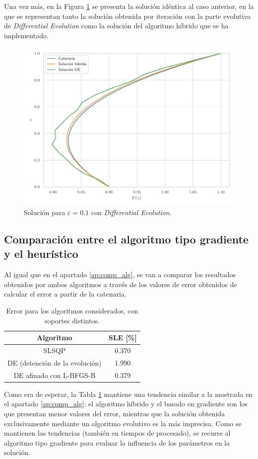 Una vez más, en la Figura \ref{fig:sol_eps_de} se presenta la solución idéntica al caso anterior, en la que se representan tanto la solución obtenida por iteración con la parte evolutiva de \textit{Differential Evolution} como la solución del algoritmo híbrido que se ha implementado.

\begin{figure}[h]
    \centering
    \includegraphics[width = 0.6 \linewidth]{Figures/01/sol_eps_de.pdf}
    \caption{Solución para $\varepsilon = 0.1$ con \textit{Differential Evolution}.}
    \label{fig:sol_eps_de}
\end{figure}

\subsection{Comparación entre el algoritmo tipo gradiente y el heurístico} 

Al igual que en el apartado \ref{ap:comp_alg}, se van a comparar los resultados obtenidos por ambos algoritmos a través de los valores de error obtenidos de calcular el error a partir de la catenaria.

\begin{table}[h]
    \centering
    \caption{Error para los algoritmos considerados, con soportes distintos.}
    \begin{tabular}{c c}
        \hline
        \textbf{Algoritmo} & \textbf{SLE} [\%] \\ \hline \hline   
        SLSQP & 0.370 \\ \hline
        DE (detención de la evolución) & 1.990 \\ \hline
        DE afinado con L-BFGS-B & 0.379 \\ \hline
    \end{tabular}
    \label{tab:error_algs_sop}
\end{table}

Como era de esperar, la Tabla \ref{tab:error_algs_sop} mantiene una tendencia similar a la mostrada en el apartado \ref{ap:comp_alg}: el algoritmo híbrido y el basado en gradiente son los que presentan menor valores del error, mientras que la solución obtenida exclusivamente mediante un algoritmo evolutivo es la más imprecisa. Como se mantienen las tendencias (también en tiempos de procesado), se recurre al algoritmo tipo gradiente para evaluar la influencia de los parámetros en la solución.


